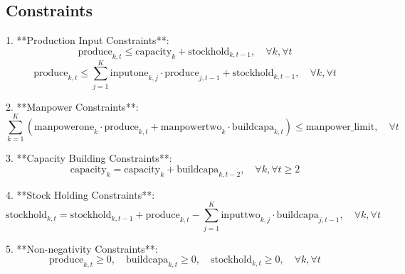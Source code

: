 \documentclass{article}
\begin{document}
\subsection*{Constraints}
1. **Production Input Constraints**:
\[
\text{produce}_{k, t} \leq \text{capacity}_{k} + \text{stockhold}_{k, t-1}, \quad \forall k, \forall t
\]
\[
\text{produce}_{k, t} \leq \sum_{j=1}^{K} \text{inputone}_{k, j} \cdot \text{produce}_{j, t-1} + \text{stockhold}_{k, t-1}, \quad \forall k, \forall t
\]

2. **Manpower Constraints**:
\[
\sum_{k=1}^{K} \left( \text{manpowerone}_{k} \cdot \text{produce}_{k, t} + \text{manpowertwo}_{k} \cdot \text{buildcapa}_{k, t} \right) \leq \text{manpower\_limit}, \quad \forall t
\]

3. **Capacity Building Constraints**:
\[
\text{capacity}_{k} = \text{capacity}_{k} + \text{buildcapa}_{k, t-2}, \quad \forall k, \forall t \geq 2
\]

4. **Stock Holding Constraints**:
\[
\text{stockhold}_{k, t} = \text{stockhold}_{k, t-1} + \text{produce}_{k, t} - \sum_{j=1}^{K} \text{inputtwo}_{k, j} \cdot \text{buildcapa}_{j, t-1}, \quad \forall k, \forall t
\]

5. **Non-negativity Constraints**:
\[
\text{produce}_{k, t} \geq 0, \quad \text{buildcapa}_{k, t} \geq 0, \quad \text{stockhold}_{k, t} \geq 0, \quad \forall k, \forall t
\]
\end{document}
